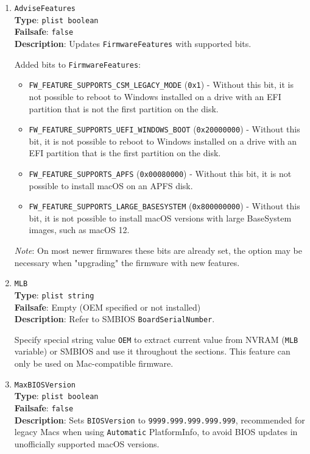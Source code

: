 \documentclass[]{article}
\begin{document}
\begin{enumerate}

\item
  \texttt{AdviseFeatures}\\
  \textbf{Type}: \texttt{plist\ boolean}\\
  \textbf{Failsafe}: \texttt{false}\\
  \textbf{Description}: Updates \texttt{FirmwareFeatures} with supported bits.

  Added bits to \texttt{FirmwareFeatures}:

  \begin{itemize}
    \item \texttt{FW\_FEATURE\_SUPPORTS\_CSM\_LEGACY\_MODE} (\texttt{0x1})
    - Without this bit, it is not possible to reboot to Windows installed on
      a drive with an EFI partition that is not the first partition on the disk.
    \item \texttt{FW\_FEATURE\_SUPPORTS\_UEFI\_WINDOWS\_BOOT} (\texttt{0x20000000})
    - Without this bit, it is not possible to reboot to Windows installed on
      a drive with an EFI partition that is the first partition on the disk.
    \item \texttt{FW\_FEATURE\_SUPPORTS\_APFS} (\texttt{0x00080000})
    - Without this bit, it is not possible to install macOS on an APFS disk.
    \item \texttt{FW\_FEATURE\_SUPPORTS\_LARGE\_BASESYSTEM} (\texttt{0x800000000})
    - Without this bit, it is not possible to install macOS versions with large
      BaseSystem images, such as macOS 12.
  \end{itemize}

  \emph{Note}: On most newer firmwares these bits are already set, the option
  may be necessary when "upgrading" the firmware with new features.

\item
  \texttt{MLB}\\
  \textbf{Type}: \texttt{plist\ string}\\
  \textbf{Failsafe}: Empty (OEM specified or not installed)\\
  \textbf{Description}: Refer to SMBIOS \texttt{BoardSerialNumber}.

  Specify special string value \texttt{OEM} to extract current value from NVRAM
  (\texttt{MLB} variable) or SMBIOS and use it throughout the sections.
  This feature can only be used on Mac-compatible firmware.

\item
  \texttt{MaxBIOSVersion}\\
  \textbf{Type}: \texttt{plist\ boolean}\\
  \textbf{Failsafe}: \texttt{false}\\
  \textbf{Description}: Sets \texttt{BIOSVersion} to \texttt{9999.999.999.999.999}, recommended for legacy
  Macs when using \texttt{Automatic} PlatformInfo, to avoid BIOS updates in unofficially supported macOS
  versions.


\end{enumerate}
\end{document}
